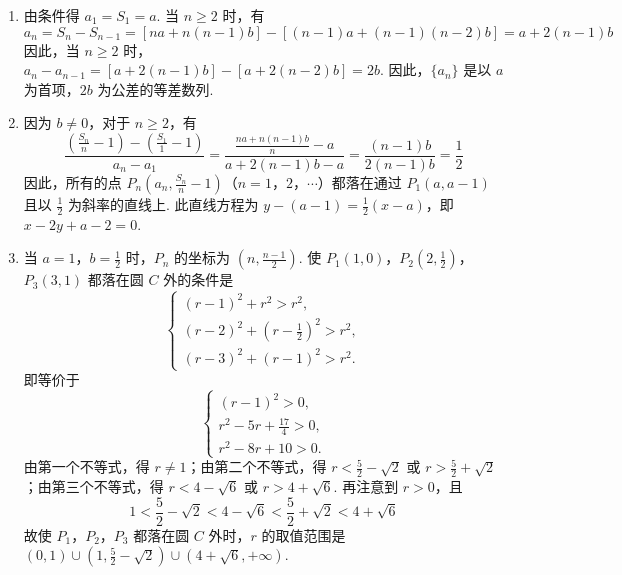\documentclass[UTF8,a4paper,oneside,11pt]{ctexbook}
\begin{document}
\begin{solution}
\begin{enumerate}
\item 由条件得 \(a_1 = S_1 = a\). 当 \(n \geqslant 2\) 时，有
\[
a_n = S_n - S_{n - 1} = \left[na + n(n - 1)b\right] - \left[(n - 1)a + (n - 1)(n - 2)b\right] = a + 2(n - 1)b
\]
因此，当 \(n \geqslant 2\) 时，\(a_n - a_{n - 1} = \left[a + 2(n - 1)b\right] - \left[a + 2(n - 2)b\right] = 2b\).
因此，\(\{a_n\}\) 是以 \(a\) 为首项，\(2b\) 为公差的等差数列.

\item 因为 \(b \neq 0\)，对于 \(n \geqslant 2\)，有
\[
\frac{\left(\frac{S_n}{n} - 1\right) - \left(\frac{S_1}{1} - 1\right)}{a_n - a_1}
= \frac{\frac{na + n(n - 1)b}{n} - a}{a + 2(n - 1)b - a}
= \frac{(n - 1)b}{2(n - 1)b}
= \frac{1}{2}
\]
因此，所有的点 \(P_n\left(a_n,\frac{S_n}{n} - 1\right)\)（\(n = 1\)，\(2\)，\(\cdots\)）都落在通过 \(P_1(a,a - 1)\) 且以 \(\frac{1}{2}\) 为斜率的直线上. 此直线方程为 \(y - (a - 1) = \frac{1}{2}(x - a)\)，即 \(x - 2y + a - 2 = 0\).

\item 当 \(a = 1\)，\(b = \frac{1}{2}\) 时，\(P_n\) 的坐标为 \(\left(n,\frac{n - 1}{2}\right)\). 使 \(P_1(1,0)\)，\(P_2\left(2,\frac{1}{2}\right)\)，\(P_3(3,1)\) 都落在圆 \(C\) 外的条件是
\[
\begin{cases}
(r - 1)^2 + r^2 > r^2,\\
(r - 2)^2 + \left(r - \frac{1}{2}\right)^2 > r^2,\\
(r - 3)^2 + (r - 1)^2 > r^2.
\end{cases}
\]
即等价于
\[
\begin{cases}
(r - 1)^2 > 0,\\
r^2 - 5r + \frac{17}{4} > 0,\\
r^2 - 8r + 10 > 0.
\end{cases}
\]
由第一个不等式，得 \(r \neq 1\)；由第二个不等式，得 \(r < \frac{5}{2} - \sqrt{2}\) 或 \(r > \frac{5}{2} + \sqrt{2}\)；由第三个不等式，得 \(r < 4 - \sqrt{6}\) 或 \(r > 4 + \sqrt{6}\). 再注意到 \(r > 0\)，且
\[
1 < \frac{5}{2} - \sqrt{2} < 4 - \sqrt{6} < \frac{5}{2} + \sqrt{2} < 4 + \sqrt{6}
\]
故使 \(P_1\)，\(P_2\)，\(P_3\) 都落在圆 \(C\) 外时，\(r\) 的取值范围是
\((0,1) \cup \left(1,\frac{5}{2} - \sqrt{2}\right) \cup (4 + \sqrt{6}, +\infty)\).
\end{enumerate}
\end{solution}
\end{document}
